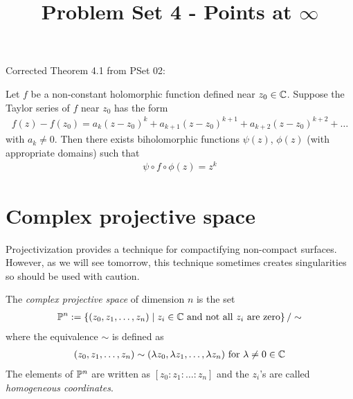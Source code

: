 \documentclass{article}
\begin{document}
  \title{Problem Set 4 - Points at $\infty$}
  \date{}
  \maketitle







\begin{mdframed}
  Corrected Theorem 4.1 from PSet 02:
  \begin{theorem}
    Let $f$ be a non-constant holomorphic function defined near $z_0 \in \mathbb{C}$.
    Suppose the Taylor series of $f$ near $z_0$ has the form
    \begin{align*}
      f(z) - f(z_0) = a_k (z - z_0)^k + a_{k+1} (z - z_0)^{k+1} + a_{k+2} (z - z_0)^{k+2} + \dots
    \end{align*}
    with $a_k \neq 0$.
    Then there exists biholomorphic functions $\psi(z)$, $\phi(z)$ (with appropriate domains) such that
    \begin{align*}
      \psi \circ f \circ \phi (z) = z^k
    \end{align*}
  \end{theorem}
\end{mdframed}



\section{Complex projective space}

Projectivization provides a technique for compactifying non-compact surfaces.
However, as we will see tomorrow, this technique sometimes creates singularities so should be used with caution.

\begin{definition}
  The \emph{complex projective space} of dimension $n$ is the set
  \begin{align*}
    \mathbb{P}^n := \left\{(z_0, z_1, \dots, z_n)  \mid  z_i \in \mathbb{C} \mbox{ and not all $z_i$ are zero}\right\}/\sim
  \end{align*}
  where the equivalence $\sim$ is defined as
  \begin{align*}
    (z_0, z_1, \dots, z_n) \sim (\lambda z_0, \lambda z_1, \dots,\lambda z_n) \mbox{ for } \lambda \neq 0 \in \mathbb{C}
  \end{align*}
  The elements of $\mathbb{P}^n$ are written as $[z_0: z_1 : \dots : z_n]$ and the $z_i$'s are called \emph{homogeneous coordinates}.
\end{definition}
\end{document}
